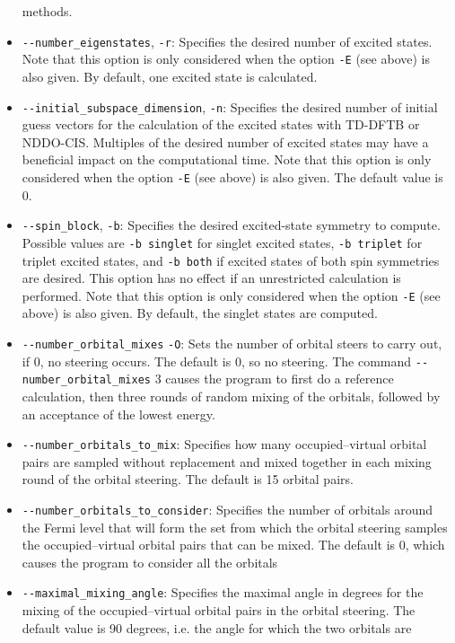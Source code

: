 \documentclass[]{tufte-book}
\begin{document}
\begin{itemize}
    methods.
\item \texttt{-{}-number\_eigenstates}, \texttt{-r}: Specifies the desired number of
  excited states. Note that this option is only considered when the option \texttt{-E} (see above) is also given.
By default, one excited state is calculated.
\item \texttt{-{}-initial\_subspace\_dimension}, \texttt{-n}: Specifies the desired number of
  initial guess vectors for the calculation of the excited states with TD-DFTB
    or NDDO-CIS. Multiples of the desired number of excited states may have a
    beneficial impact on the computational time. Note that this option is only considered when the option \texttt{-E}
(see above) is also given. The default value is 0.
\item \texttt{-{}-spin\_block}, \texttt{-b}: Specifies the desired excited-state
  symmetry to compute. Possible values are \texttt{-b singlet} for singlet
    excited states, \texttt{-b triplet} for triplet excited states, and
    \texttt{-b both} if excited states of both spin symmetries are desired. This
    option has no effect if an unrestricted calculation is performed. Note that this option is only considered when the
option \texttt{-E} (see above) is also given. By default, the singlet states are computed.
\item \texttt{-{}-number\_orbital\_mixes} \texttt{-O}:
    Sets the number of orbital steers to carry out, if 0, no steering occurs.
    The default is 0, so no steering. The command
    \texttt{-{}-number\_orbital\_mixes} 3 causes the program to first do a
    reference calculation, then three rounds of random mixing of the orbitals, 
    followed by an acceptance of the lowest energy.
\item \texttt{-{}-number\_orbitals\_to\_mix}: Specifies how many
  occupied--virtual orbital pairs are
  sampled without replacement and mixed together in each mixing round of the
  orbital steering. The default is 15 orbital pairs.
\item \texttt{-{}-number\_orbitals\_to\_consider}: Specifies the number of
  orbitals around the Fermi level that will form the set from which the orbital steering 
  samples the occupied--virtual orbital pairs that can be mixed. The default is
  0, which causes the program to consider all the orbitals
\item \texttt{-{}-maximal\_mixing\_angle}: Specifies the maximal angle in
  degrees for the 
  mixing of the occupied--virtual orbital pairs in the orbital steering. The
  default value is 90 degrees, i.e. the angle for which the two orbitals are

\end{itemize}
\end{document}
